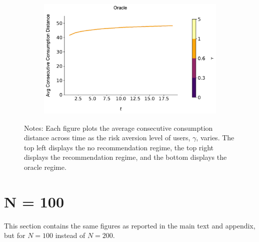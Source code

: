 \documentclass[format=acmsmall, review=true]{acmart}
\begin{document}
\begin{figure}[H]
\begin{subfigure}{.45\textwidth}
\end{subfigure}\\
\begin{subfigure}{.45\textwidth}
\includegraphics[width=\linewidth]{figures/gamma_consumption_dist_N_200T_20_omni.pdf}\\
\end{subfigure}%
\caption*{\scriptsize Notes: Each figure plots the average consecutive consumption distance across time as the risk aversion level of users, $\gamma$, varies. The top left displays the no recommendation regime, the top right displays the recommendation regime, and the bottom displays the oracle regime.}
\label{fig:no_rec_risk_aversion}
\end{figure}
\addtocounter{figure}{-1}


\clearpage
\section{N = 100}
This section contains the same figures as reported in the main text and appendix, but for $N = 100$ instead of $N = 200$.
\end{document}
